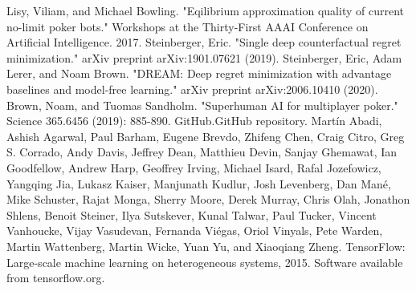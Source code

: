 \documentclass[12pt,oneside,a4paper]{report}
\begin{document}
\begin{thebibliography}{100}
    Lisy, Viliam, and Michael Bowling. "Eqilibrium approximation quality of current no-limit poker bots." Workshops at the Thirty-First AAAI Conference on Artificial Intelligence. 2017.
    Steinberger, Eric. "Single deep counterfactual regret minimization." arXiv preprint arXiv:1901.07621 (2019).
    Steinberger, Eric, Adam Lerer, and Noam Brown. "DREAM: Deep regret minimization with advantage baselines and model-free learning." arXiv preprint arXiv:2006.10410 (2020).
    Brown, Noam, and Tuomas Sandholm. "Superhuman AI for multiplayer poker." Science 365.6456 (2019): 885-890.
     GitHub.GitHub repository.
    Martín Abadi, Ashish Agarwal, Paul Barham, Eugene Brevdo,
Zhifeng Chen, Craig Citro, Greg S. Corrado, Andy Davis,
Jeffrey Dean, Matthieu Devin, Sanjay Ghemawat, Ian Goodfellow,
Andrew Harp, Geoffrey Irving, Michael Isard, Rafal Jozefowicz, Yangqing Jia,
Lukasz Kaiser, Manjunath Kudlur, Josh Levenberg, Dan Mané, Mike Schuster,
Rajat Monga, Sherry Moore, Derek Murray, Chris Olah, Jonathon Shlens,
Benoit Steiner, Ilya Sutskever, Kunal Talwar, Paul Tucker,
Vincent Vanhoucke, Vijay Vasudevan, Fernanda Viégas,
Oriol Vinyals, Pete Warden, Martin Wattenberg, Martin Wicke,
Yuan Yu, and Xiaoqiang Zheng.
TensorFlow: Large-scale machine learning on heterogeneous systems,
2015. Software available from tensorflow.org.
\end{thebibliography}
\end{document}
